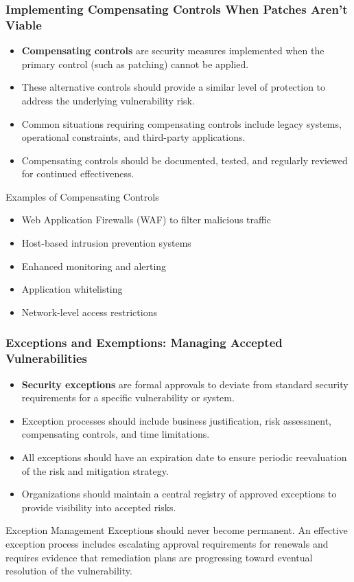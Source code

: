 \documentclass{beamer}
\begin{document}
\begin{frame}
    \frametitle{Implementing Compensating Controls When Patches Aren't Viable}
    \begin{itemize}
        \item \textbf{Compensating controls} are security measures implemented when the primary control (such as patching) cannot be applied.
        \item These alternative controls should provide a similar level of protection to address the underlying vulnerability risk.
        \item Common situations requiring compensating controls include legacy systems, operational constraints, and third-party applications.
        \item Compensating controls should be documented, tested, and regularly reviewed for continued effectiveness.
    \end{itemize}
    
    \begin{block}{Examples of Compensating Controls}
    \scriptsize
    \begin{itemize}
        \item Web Application Firewalls (WAF) to filter malicious traffic
        \item Host-based intrusion prevention systems
        \item Enhanced monitoring and alerting
        \item Application whitelisting
        \item Network-level access restrictions
    \end{itemize}
    \end{block}
    \end{frame}
    
    \begin{frame}
    \frametitle{Exceptions and Exemptions: Managing Accepted Vulnerabilities}
    \begin{itemize}
        \item \textbf{Security exceptions} are formal approvals to deviate from standard security requirements for a specific vulnerability or system.
        \item Exception processes should include business justification, risk assessment, compensating controls, and time limitations.
        \item All exceptions should have an expiration date to ensure periodic reevaluation of the risk and mitigation strategy.
        \item Organizations should maintain a central registry of approved exceptions to provide visibility into accepted risks.
    \end{itemize}
    
    \begin{alertblock}{Exception Management}
    \scriptsize
    Exceptions should never become permanent. An effective exception process includes escalating approval requirements for renewals and requires evidence that remediation plans are progressing toward eventual resolution of the vulnerability.
    \end{alertblock}
    \end{frame}
    
\end{document}
